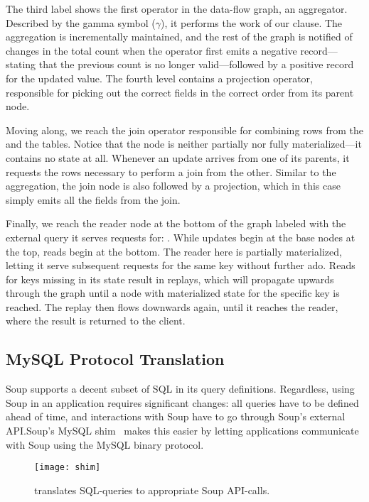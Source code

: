 The third label shows the first operator in the data-flow graph,
an aggregator. Described by the gamma symbol ($ \gamma $), it performs the work
of our  clause. The aggregation is incrementally maintained,
and the rest of the graph is notified of changes in the total count when the
operator first emits a negative record---stating that the previous
count is no longer valid---followed by a positive record for the updated value.
The fourth level contains a projection operator, responsible for picking out the
correct fields in the correct order from its parent node.

Moving along, we reach the join operator responsible for combining rows from the
 and the  tables. Notice that the node is neither
partially nor fully materialized---it contains no state at all. Whenever an
update arrives from one of its parents, it requests the rows necessary to
perform a join from the other. Similar to the aggregation, the join node is also
followed by a projection, which in this case simply emits all the fields from
the join.

Finally, we reach the reader node at the bottom of the graph labeled with the
external query it serves requests for: . While
updates begin at the base nodes at the top, reads begin at the bottom. The
reader here is partially materialized, letting it serve subsequent requests for
the same key without further ado. Reads for keys missing in its state result in
replays, which will propagate upwards through the graph until a node with
materialized state for the specific key is reached. The replay then flows
downwards again, until it reaches the reader, where the result is returned to
the client.

\subsection{MySQL Protocol Translation}\label{sec:mysql-shim}

Soup supports a decent subset of SQL in its query definitions. Regardless, using
Soup in an application requires significant changes: all queries have to be
defined ahead of time, and interactions with Soup have to go through Soup's
external API.\@ Soup's MySQL shim~\cite{soup-mysql} makes this easier by letting
applications communicate with Soup using the MySQL binary protocol.

\begin{figure}[H]
  \centering
  \texttt{[image: shim]}
  \caption{ translates SQL-queries to appropriate Soup
  API-calls.}
\end{figure}

